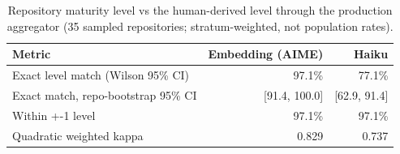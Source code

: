 \begin{table}[t]
\centering
\caption{Repository maturity level vs the human-derived level through the production aggregator (35 sampled repositories; stratum-weighted, not population rates).}
\label{tab:repo-level}
\begin{tabular}{lrr}
\toprule
Metric & Embedding (AIME) & Haiku \\
\midrule
Exact level match (Wilson 95\% CI) & 97.1\% & 77.1\% \\
Exact match, repo-bootstrap 95\% CI & [91.4, 100.0] & [62.9, 91.4] \\
Within +-1 level & 97.1\% & 97.1\% \\
Quadratic weighted kappa & 0.829 & 0.737 \\
\bottomrule
\end{tabular}
\end{table}
